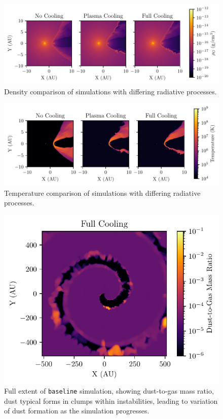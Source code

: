 \begin{figure}
  \centering
  \includegraphics{assets/results/radiative/radiative-crop-2-rho.pdf}
  \caption[Density comparison of simulations with differing radiative processes]{Density comparison of simulations with differing radiative processes.}
  \label{fig:postshockcompression}
\end{figure}

\begin{figure}
  \centering
  \includegraphics{assets/results/radiative/radiative-crop-2-temp.pdf}
  \caption[Temperature comparison of simulations with differing radiative processes]{Temperature comparison of simulations with differing radiative processes.}
  \label{fig:postshocktemperature}
\end{figure}

\begin{figure}
  \centering
  \includegraphics{assets/results/radiative/z.pdf}
  \caption[\texttt{Baseline} simulation $z$, full extent]{Full extent of \texttt{baseline} simulation, showing dust-to-gas mass ratio, dust typical forms in clumps within instabilities, leading to variation of dust formation as the simulation progresses.}
  \label{fig:full-radiative-z}
\end{figure}


